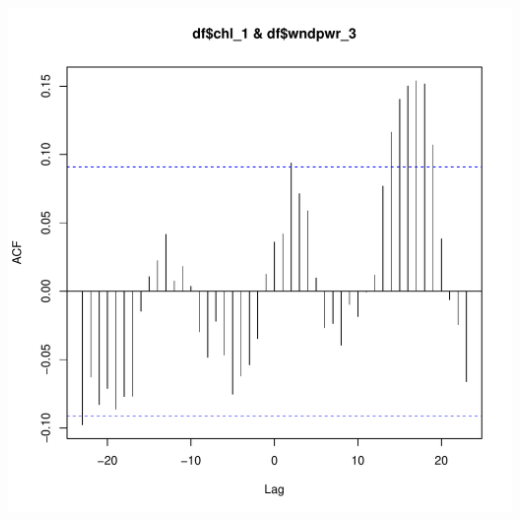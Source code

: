 \documentclass{article}\usepackage[]{graphicx}\usepackage[]{color}
\makeatletter
\def\maxwidth{ %
  \ifdim\Gin@nat@width>\linewidth
    \linewidth
  \else
    \Gin@nat@width
  \fi
}
\newenvironment{knitrout}{}{} %
\makeatother
\begin{document}
\begin{knitrout}
\includegraphics[width=\maxwidth]{figure/unnamed-chunk-29-2} 

\end{knitrout}
\end{document}
